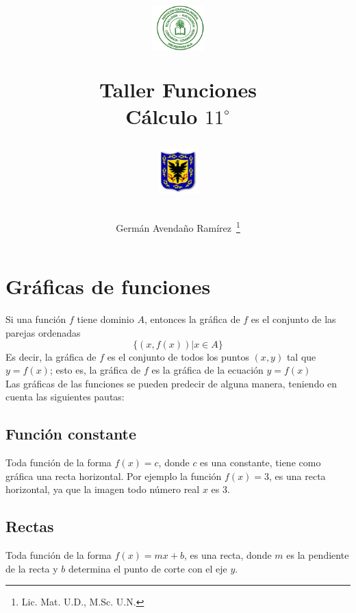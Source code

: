 \documentclass[10pt,twoside]{article}
\author{Germ\'an Avenda\~no Ram\'irez~\thanks{Lic. Mat. U.D., M.Sc. U.N.}}
\title{\begin{minipage}{.2\textwidth}
\includegraphics[height=1.75cm]{Images/logo-colegio.png}\end{minipage}
\begin{minipage}{.55\textwidth}
\begin{center}
Taller Funciones \\
Cálculo $11^{\circ}$
\end{center}
\end{minipage}\hfill
\begin{minipage}{.2\textwidth}
\includegraphics[height=1.75cm]{Images/logo-sed.png} 
\end{minipage}}
\date{}
\begin{document}
\maketitle
\begin{minipage}{.95\textwidth}
\end{minipage}
\section{Gráficas de funciones}
Si una función $ f $ tiene dominio $ A $, entonces la gráfica de $ f $ es el conjunto de las parejas ordenadas
\[ \{(x,f(x)) | x \in A\} \]
Es decir, la gráfica de $ f $ es el conjunto de todos los puntos $ (x,y) $ tal que $ y=f(x) $; esto es, la gráfica de $ f $ es la gráfica de la ecuación $ y=f(x) $\\

Las gráficas de las funciones se pueden predecir de alguna manera, teniendo en cuenta las siguientes pautas:
\subsection{Función constante}
Toda función de la forma $ f(x)=c $, donde $ c $ es una constante, tiene como gráfica una recta horizontal. Por ejemplo la función $ f(x)=3 $, es una recta horizontal, ya que la imagen todo número real $ x $ es 3.
\subsection{Rectas}
Toda función de la forma $ f(x)=mx+b $, es una recta, donde $ m $ es la pendiente de la recta y $ b $ determina el punto de corte con el eje $ y $.
\end{document}
